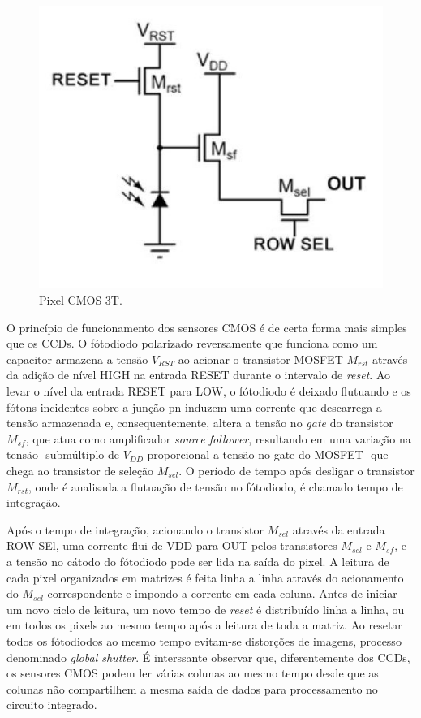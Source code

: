\documentclass[10pt,a4paper,twocolumn]{article}
\begin{document}
	\begin{figure}[!h]
		\centering
		\includegraphics[scale=0.12]{imagens/cmos_3t.jpg}
		\caption{Pixel CMOS 3T.}
	\end{figure}
	
	O princípio de funcionamento dos sensores CMOS é de certa forma mais simples que os CCDs. O fótodiodo polarizado reversamente que funciona como um capacitor armazena a tensão $V_{RST}$ ao acionar o transistor MOSFET $M_{rst}$ através da adição de nível HIGH na entrada RESET durante o intervalo de \textit{reset}. Ao levar o nível da entrada RESET para LOW, o fótodiodo é deixado flutuando e os fótons incidentes sobre a junção pn induzem uma corrente que descarrega a tensão armazenada e, consequentemente, altera a tensão no \textit{gate} do transistor $M_{sf}$, que atua como amplificador \textit{source follower}, resultando em uma variação na tensão -submúltiplo de $V_{DD}$ proporcional a tensão no gate do MOSFET- que chega ao transistor de seleção $M_{sel}$. O período de tempo após desligar o transistor $M_{rst}$, onde é analisada a flutuação de tensão no fótodiodo, é chamado tempo de integração.
	
	Após o tempo de integração, acionando o transistor $M_{sel}$ através da entrada ROW SEl, uma corrente flui de VDD para OUT pelos transistores $M_{sel}$ e $M_{sf}$, e a tensão no cátodo do fótodiodo pode ser lida na saída do pixel. A leitura de cada pixel organizados em matrizes é feita linha a linha através do acionamento do $M_{sel}$ correspondente e impondo a corrente em cada coluna. Antes de iniciar um novo ciclo de leitura, um novo tempo de \textit{reset} é distribuído linha a linha, ou em todos os pixels ao mesmo tempo após a leitura de toda a matriz. Ao resetar todos os fótodiodos ao mesmo tempo evitam-se distorções de imagens, processo denominado \textit{global shutter}. É interssante observar que, diferentemente dos CCDs, os sensores CMOS podem ler várias colunas ao mesmo tempo desde que as colunas não compartilhem a mesma saída de dados para processamento no circuito integrado.
	
\end{document}
